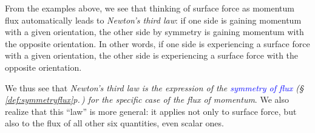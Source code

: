 \documentclass[a4paper,12pt,%
onecolumn,oneside,%
british%
]{memoir}
\newcommand{\langnohyph}[1]{\begin{hyphenrules}{nohyphenation}#1\end{hyphenrules}}
\newcommand*{\amp}{\&}
\renewcommand*{\|}[1][]{\nonscript\:#1\vert\nonscript\:\mathopen{}}
\newcommand*{\sect}{\S}%
\renewcommand*{\autoref}[3][\sect\,\ref]{\textcolor{blue}{#3} {\color{blue}\scriptsize(\faIcon[regular]{eye}\;#1{#2}\;p.\,\pageref{#2})}}
\begin{document}
%
%
From the examples above, we see that thinking of surface force as momentum flux automatically leads to \emph{Newton's third law}: if one side is gaining momentum with a given orientation, the other side by symmetry is gaining momentum with the opposite orientation. In other words, if one side is experiencing a surface force with a given orientation, the other side is experiencing a surface force with the opposite orientation.

We thus see that \emph{Newton's third law is the expression of the \autoref{def:symmetryflux}{symmetry of flux} for the specific case of the flux of momentum}. We also realize that this \enquote{law} is more general: it applies not only to surface force, but also to the flux of all other six quantities, even scalar ones.

% 
\end{document}
